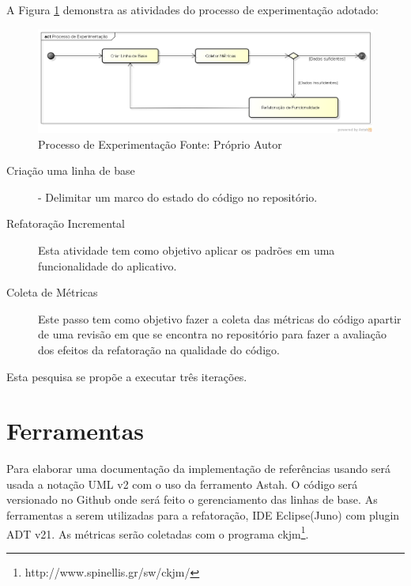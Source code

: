 A Figura \ref{processo_experimentacao} demonstra as atividades do processo de
experimentação adotado:
\begin{figure}[!h]
	\centering
	\includegraphics[scale=0.5]{img/processo_experimentacao.png}
	\caption{Processo de Experimentação Fonte: Próprio Autor}
	\label{processo_experimentacao}
\end{figure}

\begin{description}
\item[Criação uma linha de base] - Delimitar um marco do estado do código no
repositório.
\item[Refatoração Incremental] Esta atividade tem como objetivo aplicar os
padrões em uma funcionalidade do aplicativo.
\item[Coleta de Métricas] Este passo tem como objetivo fazer a coleta
das métricas do código apartir de uma revisão em que se encontra no repositório
para fazer a avaliação dos efeitos da refatoração na qualidade do código.
\end{description}

Esta pesquisa se propõe a executar três iterações.

\section{Ferramentas}

Para elaborar uma documentação da implementação de referências usando será usada
a notação UML v2 com o uso da ferramento Astah. O código será versionado no
Github onde será feito o gerenciamento das linhas de base. As ferramentas a
serem utilizadas para a refatoração, IDE Eclipse(Juno) com plugin ADT v21. As
métricas serão coletadas com o programa
ckjm\footnote{http://www.spinellis.gr/sw/ckjm/}.
